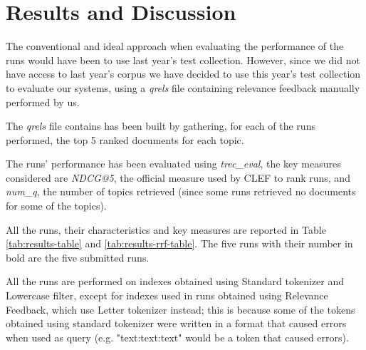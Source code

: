 \section{Results and Discussion}
\label{sec:results}

The conventional and ideal approach when evaluating the performance of the runs would have been to use last year's test collection. However, since we did not have access to last year's corpus we have decided to use this year's test collection to evaluate our systems, using a \textit{qrels} file containing relevance feedback manually performed by us.

The \textit{qrels} file contains has been built by gathering, for each of the runs performed, the top 5 ranked documents for each topic.

The runs' performance has been evaluated using \textit{trec\_eval}, the key measures considered are \textit{NDCG@5}, the official measure used by CLEF to rank runs, and \textit{num\_q}, the number of topics retrieved (since some runs retrieved no documents for some of the topics).

All the runs, their characteristics and key measures are reported in Table \ref{tab:results-table} and \ref{tab:results-rrf-table}. The five runs with their number in bold are the five submitted runs.

All the runs are performed on indexes obtained using Standard tokenizer and Lowercase filter, except for indexes used in runs obtained using Relevance Feedback, which use Letter tokenizer instead; this is because some of the tokens obtained using standard tokenizer were written in a format that caused errors when used as query (e.g. "text:text:text" would be a token that caused errors).

